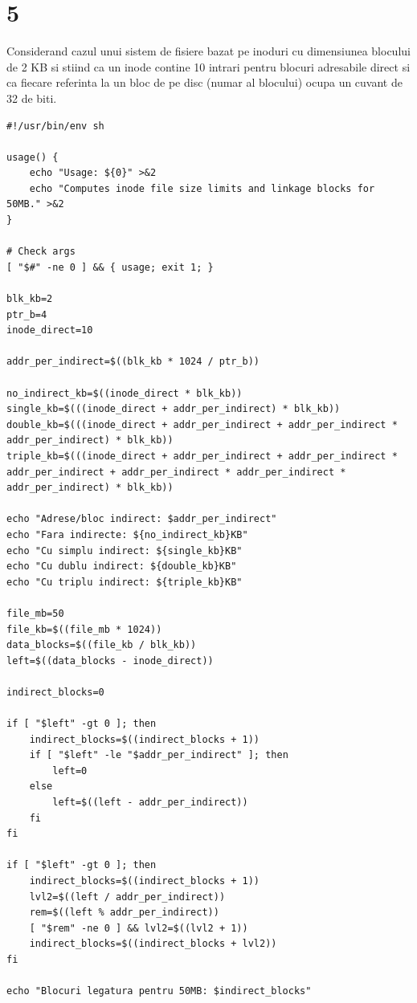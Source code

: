 \documentclass[11pt]{article}
\begin{document}
\section{5}
\label{sec:org2eaa254}
Considerand cazul unui sistem de fisiere bazat pe inoduri cu dimensiunea blocului de 2 KB si stiind ca un inode contine 10 intrari pentru blocuri adresabile direct si ca fiecare referinta la un bloc de pe disc (numar al blocului) ocupa un cuvant de 32 de biti.

\begin{verbatim}
#!/usr/bin/env sh

usage() {
    echo "Usage: ${0}" >&2
    echo "Computes inode file size limits and linkage blocks for 50MB." >&2
}

# Check args
[ "$#" -ne 0 ] && { usage; exit 1; }

blk_kb=2
ptr_b=4
inode_direct=10

addr_per_indirect=$((blk_kb * 1024 / ptr_b))

no_indirect_kb=$((inode_direct * blk_kb))
single_kb=$(((inode_direct + addr_per_indirect) * blk_kb))
double_kb=$(((inode_direct + addr_per_indirect + addr_per_indirect * addr_per_indirect) * blk_kb))
triple_kb=$(((inode_direct + addr_per_indirect + addr_per_indirect * addr_per_indirect + addr_per_indirect * addr_per_indirect * addr_per_indirect) * blk_kb))

echo "Adrese/bloc indirect: $addr_per_indirect"
echo "Fara indirecte: ${no_indirect_kb}KB"
echo "Cu simplu indirect: ${single_kb}KB"
echo "Cu dublu indirect: ${double_kb}KB"
echo "Cu triplu indirect: ${triple_kb}KB"

file_mb=50
file_kb=$((file_mb * 1024))
data_blocks=$((file_kb / blk_kb))
left=$((data_blocks - inode_direct))

indirect_blocks=0

if [ "$left" -gt 0 ]; then
    indirect_blocks=$((indirect_blocks + 1))
    if [ "$left" -le "$addr_per_indirect" ]; then
        left=0
    else
        left=$((left - addr_per_indirect))
    fi
fi

if [ "$left" -gt 0 ]; then
    indirect_blocks=$((indirect_blocks + 1))
    lvl2=$((left / addr_per_indirect))
    rem=$((left % addr_per_indirect))
    [ "$rem" -ne 0 ] && lvl2=$((lvl2 + 1))
    indirect_blocks=$((indirect_blocks + lvl2))
fi

echo "Blocuri legatura pentru 50MB: $indirect_blocks"
\end{verbatim}
\end{document}
